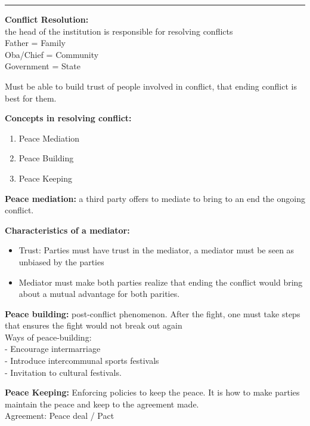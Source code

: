 \documentclass[
]{article}
\providecommand{\tightlist}{%
  \setlength{\itemsep}{0pt}\setlength{\parskip}{0pt}}
\begin{document}
\begin{center}\rule{0.5\linewidth}{0.5pt}\end{center}

\textbf{Conflict Resolution:}\\
the head of the institution is responsible for resolving conflicts\\
Father = Family\\
Oba/Chief = Community\\
Government = State

Must be able to build trust of people involved in conflict, that ending
conflict is best for them.

\textbf{Concepts in resolving conflict:}

\begin{enumerate}
\tightlist
\item
  Peace Mediation
\item
  Peace Building
\item
  Peace Keeping
\end{enumerate}

\textbf{Peace mediation:} a third party offers to mediate to bring to an
end the ongoing conflict.

\textbf{Characteristics of a mediator:}

\begin{itemize}
\tightlist
\item
  Trust: Parties must have trust in the mediator, a mediator must be
  seen as unbiased by the parties
\item
  Mediator must make both parties realize that ending the conflict would
  bring about a mutual advantage for both parities.
\end{itemize}

\textbf{Peace building:} post-conflict phenomenon. After the fight, one
must take steps that ensures the fight would not break out again\\
Ways of peace-building:\\
- Encourage intermarriage\\
- Introduce intercommunal sports festivals\\
- Invitation to cultural festivals.

\textbf{Peace Keeping:} Enforcing policies to keep the peace. It is how
to make parties maintain the peace and keep to the agreement made.\\
Agreement: Peace deal / Pact
\end{document}
